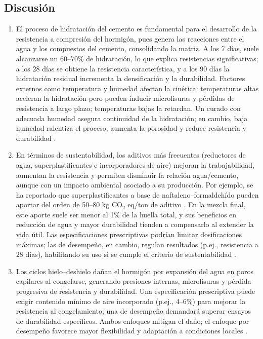 \subsection{Discusión}

\begin{enumerate}
    \item El proceso de hidratación del cemento es fundamental para el desarrollo de la resistencia a compresión del hormigón, pues genera las reacciones entre el agua y los compuestos del cemento, consolidando la matriz. A los 7 días, suele alcanzarse un 60--70\% de hidratación, lo que explica resistencias significativas; a los 28 días se obtiene la resistencia característica, y a los 90 días la hidratación residual incrementa la densificación y la durabilidad. Factores externos como temperatura y humedad afectan la cinética: temperaturas altas aceleran la hidratación pero pueden inducir microfisuras y pérdidas de resistencia a largo plazo; temperaturas bajas la retardan. Un curado con adecuada humedad asegura continuidad de la hidratación; en cambio, baja humedad ralentiza el proceso, aumenta la porosidad y reduce resistencia y durabilidad \citep{NCh170-2016}.
    
    \item En términos de sustentabilidad, los aditivos más frecuentes (reductores de agua, superplastificantes e incorporadores de aire) mejoran la trabajabilidad, aumentan la resistencia y permiten disminuir la relación agua/cemento, aunque con un impacto ambiental asociado a su producción. Por ejemplo, se ha reportado que superplastificantes a base de naftaleno–formaldehído pueden aportar del orden de 50--80 kg CO$_2$ eq/ton de aditivo \citep{Habert2011,Flower2007}. En la mezcla final, este aporte suele ser menor al 1\% de la huella total, y sus beneficios en reducción de agua y mayor durabilidad tienden a compensarlo al extender la vida útil. Las especificaciones prescriptivas podrían limitar dosificaciones máximas; las de desempeño, en cambio, regulan resultados (p.ej., resistencia a 28 días), habilitando su uso si se cumple el criterio de sustentabilidad \citep{NCh170-2016}.
    
    \item Los ciclos hielo–deshielo dañan el hormigón por expansión del agua en poros capilares al congelarse, generando presiones internas, microfisuras y pérdida progresiva de resistencia y durabilidad. Una especificación prescriptiva puede exigir contenido mínimo de aire incorporado (p.ej., 4--6\%) para mejorar la resistencia al congelamiento; una de desempeño demandará superar ensayos de durabilidad específicos. Ambos enfoques mitigan el daño; el enfoque por desempeño favorece mayor flexibilidad y adaptación a condiciones locales \citep{Powers1954,MehtaMonteiro2014}.
    

\end{enumerate}
